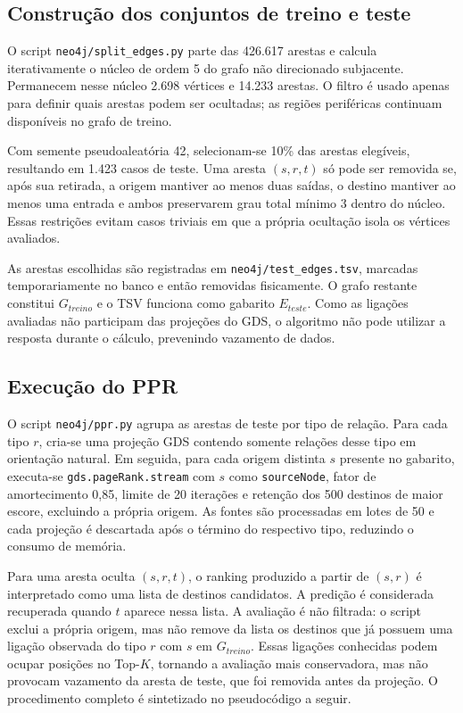 \documentclass[10pt,a4paper]{article}
\begin{document}
\subsection{Construção dos conjuntos de treino e teste}
\label{subsec:split}

O script \texttt{neo4j/split\_edges.py} parte das 426.617 arestas e calcula iterativamente o núcleo de ordem 5 do grafo não direcionado subjacente. Permanecem nesse núcleo 2.698 vértices e 14.233 arestas. O filtro é usado apenas para definir quais arestas podem ser ocultadas; as regiões periféricas continuam disponíveis no grafo de treino.

Com semente pseudoaleatória 42, selecionam-se 10\% das arestas elegíveis, resultando em 1.423 casos de teste. Uma aresta $(s,r,t)$ só pode ser removida se, após sua retirada, a origem mantiver ao menos duas saídas, o destino mantiver ao menos uma entrada e ambos preservarem grau total mínimo 3 dentro do núcleo. Essas restrições evitam casos triviais em que a própria ocultação isola os vértices avaliados.

As arestas escolhidas são registradas em \texttt{neo4j/test\_edges.tsv}, marcadas temporariamente no banco e então removidas fisicamente. O grafo restante constitui $G_{treino}$ e o TSV funciona como gabarito $E_{teste}$. Como as ligações avaliadas não participam das projeções do GDS, o algoritmo não pode utilizar a resposta durante o cálculo, prevenindo vazamento de dados.

\subsection{Execução do PPR}

O script \texttt{neo4j/ppr.py} agrupa as arestas de teste por tipo de relação. Para cada tipo $r$, cria-se uma projeção GDS contendo somente relações desse tipo em orientação natural. Em seguida, para cada origem distinta $s$ presente no gabarito, executa-se \texttt{gds.pageRank.stream} com $s$ como \texttt{sourceNode}, fator de amortecimento 0,85, limite de 20 iterações e retenção dos 500 destinos de maior escore, excluindo a própria origem. As fontes são processadas em lotes de 50 e cada projeção é descartada após o término do respectivo tipo, reduzindo o consumo de memória.

Para uma aresta oculta $(s,r,t)$, o ranking produzido a partir de $(s,r)$ é interpretado como uma lista de destinos candidatos. A predição é considerada recuperada quando $t$ aparece nessa lista. A avaliação é não filtrada: o script exclui a própria origem, mas não remove da lista os destinos que já possuem uma ligação observada do tipo $r$ com $s$ em $G_{treino}$. Essas ligações conhecidas podem ocupar posições no Top-$K$, tornando a avaliação mais conservadora, mas não provocam vazamento da aresta de teste, que foi removida antes da projeção. O procedimento completo é sintetizado no pseudocódigo a seguir.
\end{document}

